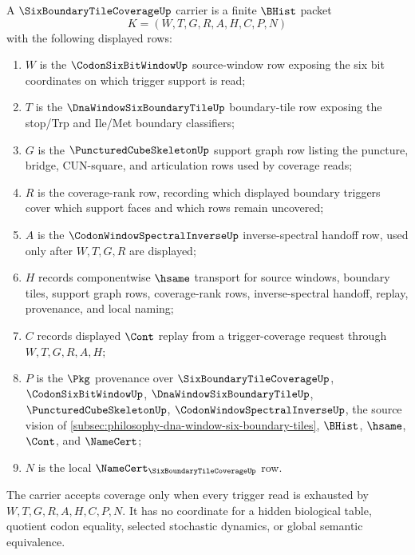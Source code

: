 \begin{definition}
\label{def:six-boundary-tile-coverage-carrier}
A $\SixBoundaryTileCoverageUp$ carrier is a finite $\BHist$ packet
$$
K=(W,T,G,R,A,H,C,P,N)
$$
with the following displayed rows:
\begin{enumerate}
\item $W$ is the $\CodonSixBitWindowUp$ source-window row exposing the six bit coordinates on which trigger support is read;
\item $T$ is the $\DnaWindowSixBoundaryTileUp$ boundary-tile row exposing the stop/Trp and Ile/Met boundary classifiers;
\item $G$ is the $\PuncturedCubeSkeletonUp$ support graph row listing the puncture, bridge, CUN-square, and articulation rows used by coverage reads;
\item $R$ is the coverage-rank row, recording which displayed boundary triggers cover which support faces and which rows remain uncovered;
\item $A$ is the $\CodonWindowSpectralInverseUp$ inverse-spectral handoff row, used only after $W,T,G,R$ are displayed;
\item $H$ records componentwise $\hsame$ transport for source windows, boundary tiles, support graph rows, coverage-rank rows, inverse-spectral handoff, replay, provenance, and local naming;
\item $C$ records displayed $\Cont$ replay from a trigger-coverage request through $W,T,G,R,A,H$;
\item $P$ is the $\Pkg$ provenance over $\SixBoundaryTileCoverageUp$, $\CodonSixBitWindowUp$, $\DnaWindowSixBoundaryTileUp$, $\PuncturedCubeSkeletonUp$, $\CodonWindowSpectralInverseUp$, the source vision of \autoref{subsec:philosophy-dna-window-six-boundary-tiles}, $\BHist$, $\hsame$, $\Cont$, and $\NameCert$;
\item $N$ is the local $\NameCert_{\SixBoundaryTileCoverageUp}$ row.
\end{enumerate}
The carrier accepts coverage only when every trigger read is exhausted by $W,T,G,R,A,H,C,P,N$. It has no coordinate for a hidden biological table, quotient codon equality, selected stochastic dynamics, or global semantic equivalence.
\end{definition}

